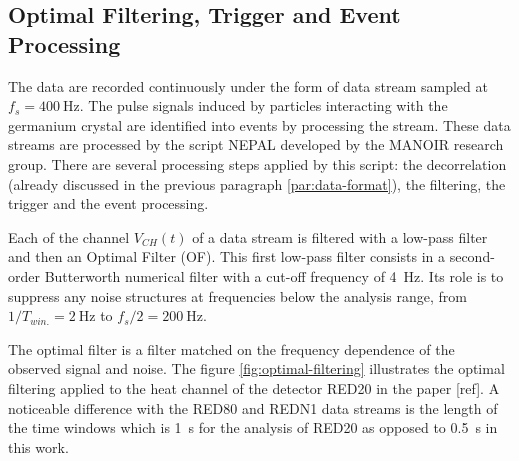 \subsection{Optimal Filtering, Trigger and Event Processing}
\label{par:optimal-filtering}


The data are recorded continuously under the form of data stream sampled at $f_s=\SI{400}{\Hz}$. The pulse signals induced by particles interacting with the germanium crystal are identified into events by processing the stream. These data streams are processed by the script NEPAL developed by the MANOIR research group. There are several processing steps applied by this script: the decorrelation (already discussed in the previous paragraph \ref{par:data-format}), the filtering, the trigger and the event processing. 

Each of the channel $V_{CH}(t)$ of a data stream is filtered with a low-pass filter and then an Optimal Filter (OF). This first low-pass filter consists in a second-order Butterworth numerical filter with a cut-off frequency of \SI{4}{\Hz}. Its role is to suppress any noise structures at frequencies below the analysis range, from $1/T_{win.}=\SI{2}{\Hz}$ to $f_s/2=\SI{200}{\Hz}$. 

The optimal filter is a filter matched on the frequency dependence of the observed signal and noise. The figure \ref{fig:optimal-filtering} illustrates the optimal filtering applied to the heat channel of the detector RED20 in the paper [ref]. A noticeable difference with the RED80 and REDN1 data streams is the length of the time windows which is \SI{1}{\s} for the analysis of RED20 as opposed to \SI{0.5}{\s} in this work.

